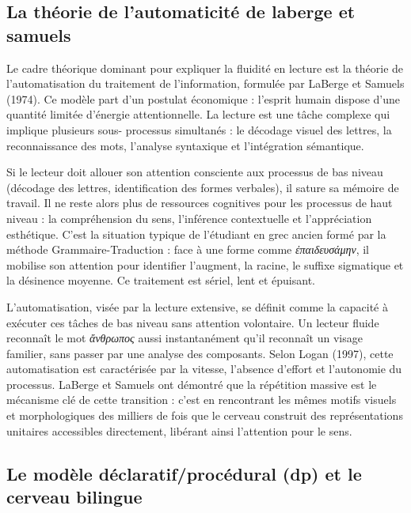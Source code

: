 \subsection{La théorie de l'automaticité de laberge et samuels}

Le cadre théorique dominant pour expliquer la fluidité en lecture est la théorie de l'automatisation
du traitement de l'information, formulée par LaBerge et Samuels (1974). Ce modèle part d'un postulat
économique : l'esprit humain dispose d'une quantité limitée d'énergie
attentionnelle.\cite{III-3-2-ref1} La lecture est une tâche complexe qui implique plusieurs sous-
processus simultanés : le décodage visuel des lettres, la reconnaissance des mots, l'analyse
syntaxique et l'intégration sémantique.

Si le lecteur doit allouer son attention consciente aux processus de bas niveau (décodage des
lettres, identification des formes verbales), il sature sa mémoire de travail. Il ne reste alors
plus de ressources cognitives pour les processus de haut niveau : la compréhension du sens,
l'inférence contextuelle et l'appréciation esthétique.\cite{III-3-2-ref1} C'est la situation typique
de l'étudiant en grec ancien formé par la méthode Grammaire-Traduction : face à une forme comme
\textit{ἐπαιδευσάμην}, il mobilise son attention pour identifier l'augment, la racine, le suffixe
sigmatique et la désinence moyenne. Ce traitement est sériel, lent et épuisant.

L'automatisation, visée par la lecture extensive, se définit comme la capacité à exécuter ces tâches
de bas niveau sans attention volontaire. Un lecteur fluide reconnaît le mot \textit{ἄνθρωπος} aussi
instantanément qu'il reconnaît un visage familier, sans passer par une analyse des composants. Selon
Logan (1997), cette automatisation est caractérisée par la vitesse, l'absence d'effort et
l'autonomie du processus.\cite{III-3-2-ref1} LaBerge et Samuels ont démontré que la répétition
massive est le mécanisme clé de cette transition : c'est en rencontrant les mêmes motifs visuels et
morphologiques des milliers de fois que le cerveau construit des représentations unitaires
accessibles directement, libérant ainsi l'attention pour le sens.\cite{III-3-2-ref2}



\subsection{Le modèle déclaratif/procédural (dp) et le cerveau bilingue}

